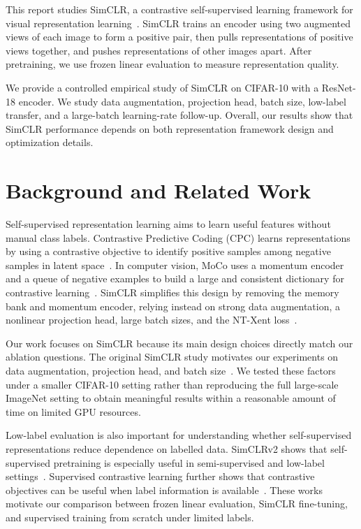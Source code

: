 \documentclass[10pt]{article}
\begin{document}
This report studies SimCLR, a contrastive self-supervised learning framework for visual representation learning~\cite{simclr}. SimCLR trains an encoder using two augmented views of each image to form a positive pair, then pulls representations of positive views together, and pushes representations of other images apart. After pretraining, we use frozen linear evaluation to measure representation quality.

We provide a controlled empirical study of SimCLR on CIFAR-10 with a ResNet-18 encoder. We study data augmentation, projection head, batch size, low-label transfer, and a large-batch learning-rate follow-up. Overall, our results show that SimCLR performance depends on both representation framework design and optimization  details.

\section{Background and Related Work}

Self-supervised representation learning aims to learn useful features without manual class labels. Contrastive Predictive Coding (CPC) learns representations by using a contrastive objective to identify positive samples among negative samples in latent space~\cite{cpc}. In computer vision, MoCo uses a momentum encoder and a queue of negative examples to build a large and consistent dictionary for contrastive learning~\cite{moco}. SimCLR simplifies this design by removing the memory bank and momentum encoder, relying instead on strong data augmentation, a nonlinear projection head, large batch sizes, and the NT-Xent loss~\cite{simclr}.

Our work focuses on SimCLR because its main design choices directly match our ablation questions. The original SimCLR study motivates our experiments on data augmentation, projection head, and batch size~\cite{simclr}. We tested these factors under a smaller CIFAR-10 setting rather than reproducing the full large-scale ImageNet setting to obtain meaningful results within a reasonable amount of time on limited GPU resources.

Low-label evaluation is also important for understanding whether self-supervised representations reduce dependence on labelled data. SimCLRv2 shows that self-supervised pretraining is especially useful in semi-supervised and low-label settings~\cite{simclrv2}. Supervised contrastive learning further shows that contrastive objectives can be useful when label information is available~\cite{supcon}. These works motivate our comparison between frozen linear evaluation, SimCLR fine-tuning, and supervised training from scratch under limited labels.
\end{document}
